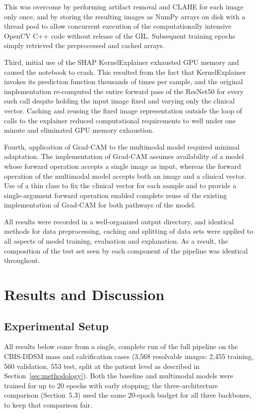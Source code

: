 This was overcome by performing artifact removal and CLAHE for each image only once, and by storing the resulting images as NumPy arrays on disk with a thread pool to allow concurrent execution of the computationally intensive OpenCV C++ code without release of the GIL. Subsequent training epochs simply retrieved the preprocessed and cached arrays.

Third, initial use of the SHAP KernelExplainer exhausted GPU memory and caused the notebook to crash. This resulted from the fact that KernelExplainer invokes its prediction function thousands of times per sample, and the original implementation re-computed the entire forward pass of the ResNet50 for every such call despite holding the input image fixed and varying only the clinical vector. Caching and reusing the fixed image representation outside the loop of calls to the explainer reduced computational requirements to well under one minute and eliminated GPU memory exhaustion.

Fourth, application of Grad-CAM to the multimodal model required minimal adaptation. The implementation of Grad-CAM assumes availability of a model whose forward operation accepts a single image as input, whereas the forward operation of the multimodal model accepts both an image and a clinical vector. Use of a thin class to fix the clinical vector for each sample and to provide a single-argument forward operation enabled complete reuse of the existing implementation of Grad-CAM for both pathways of the model.

All results were recorded in a well-organized output directory, and identical methods for data preprocessing, caching and splitting of data sets were applied to all aspects of model training, evaluation and explanation. As a result, the composition of the test set seen by each component of the pipeline was identical throughout.

\section{Results and Discussion}

\subsection{Experimental Setup}
All results below come from a single, complete run of the full pipeline on the CBIS-DDSM mass and calcification cases (3{,}568 resolvable images: 2{,}455 training, 560 validation, 553 test, split at the patient level as described in Section~\ref{sec:methodology}). Both the baseline and multimodal models were trained for up to 20 epochs with early stopping; the three-architecture comparison (Section~5.3) used the same 20-epoch budget for all three backbones, to keep that comparison fair.

